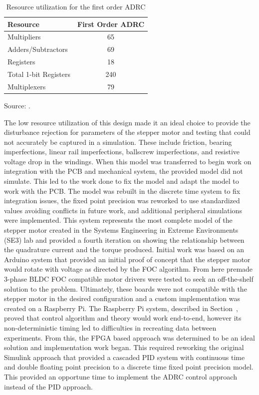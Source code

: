 \begin{table}[htbp]
	\centering
	\caption{Resource utilization for the first order ADRC \cite{binfet_implementation_2026}}
	\label{tab:first_order_adrc_resources}
	\begin{tabular}{lc}
		\hline
		\textbf{Resource} & \textbf{First Order ADRC} \\
		\hline
		Multipliers             & 65  \\
		Adders/Subtractors      & 69  \\
		Registers               & 18  \\
		Total 1-bit Registers   & 240 \\
		Multiplexers            & 79  \\
		\hline
	\end{tabular}
		\vspace{0.5ex}
	\footnotesize Source: \cite{binfet_implementation_2026}.
\end{table}

The low resource utilization of this design made it an ideal choice to provide the disturbance rejection for parameters of the stepper motor and testing that could not accurately be captured in a simulation. These include friction, bearing imperfections, linear rail imperfections, ballscrew imperfections, and resistive voltage drop in the windings. When this model was transferred to begin work on integration with the PCB and mechanical system, the provided model did not simulate. This led to the work done to fix the model and adapt the model to work with the PCB. The model was rebuilt in the discrete time system to fix integration issues, the fixed point precision was reworked to use standardized values avoiding conflicts in future work, and additional peripheral simulations were implemented. This system represents the most complete model of the stepper motor created in the Systems Engineering in Extreme Environments (SE3) lab and provided a fourth iteration on showing the relationship between the quadrature current and the torque produced. Initial work was based on an Arduino system that provided an initial proof of concept that the stepper motor would rotate with voltage as directed by the FOC algorithm. From here premade 3-phase BLDC FOC compatible motor drivers were tested to seek an off-the-shelf solution to the problem. Ultimately, these boards were not compatible with the stepper motor in the desired configuration and a custom implementation was created on a Raspberry Pi. The Raspberry Pi system, described in Section~, proved that control algorithm and theory would work end-to-end, however its non-deterministic timing led to difficulties in recreating data between experiments. From this, the FPGA based approach was determined to be an ideal solution and implementation work began. This required reworking the original Simulink approach that provided a cascaded PID system with continuous time and double floating point precision to a discrete time fixed point precision model. This provided an opportune time to implement the ADRC control approach instead of the PID approach.


